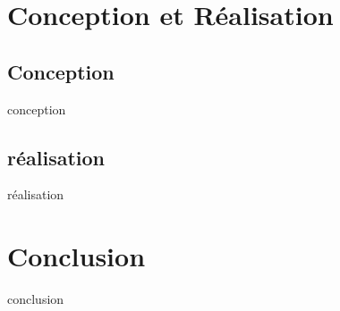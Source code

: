 \documentclass[usepdftitle=false]{beamer}
\begin{document}
	\section{Conception et Réalisation}
	\subsection{Conception}
	\begin{frame}
	conception
	\end{frame}
	\subsection{réalisation}
	\begin{frame}
	réalisation
	\end{frame}
	
	\section{Conclusion}
	\begin{frame}
	conclusion
	\end{frame}
\end{document}
